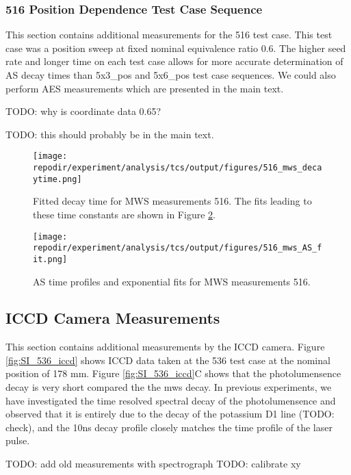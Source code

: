 \clearpage
\subsubsection{516 Position Dependence Test Case Sequence}

This section contains additional measurements for the 516 test case. This test case was a position sweep at fixed nominal equivalence ratio 0.6. The higher seed rate and longer time on each test case allows for more accurate determination of AS decay times than 5x3\_pos and 5x6\_pos test case sequences. We could also perform AES measurements which are presented in the main text. 



TODO: why is coordinate data 0.65? 

TODO: this should probably be in the main text.

\begin{figure}[]
\centering
\texttt{[image: \\repodir/experiment/analysis/tcs/output/figures/516\_mws\_decaytime.png]}
\caption{Fitted decay time for MWS measurements 516. The fits leading to these time constants are shown in Figure \ref{fig:516_mws_AS_fit}.}
\label{fig:SI_516_mws_decaytime}
\end{figure}

\begin{figure}[]
\centering
\texttt{[image: \\repodir/experiment/analysis/tcs/output/figures/516\_mws\_AS\_fit.png]}
\caption{AS time profiles and exponential fits for MWS measurements 516.}
\label{fig:516_mws_AS_fit}
\end{figure}


\clearpage
\subsection{ICCD Camera Measurements}

This section contains additional measurements by the ICCD camera. Figure \ref{fig:SI_536_iccd} shows ICCD data taken at the 536 test case at the nominal position of 178 mm. Figure \ref{fig:SI_536_iccd}C shows that the photolumensence decay is very short compared the the mws decay. In previous experiments, we have investigated the time resolved spectral decay of the photolumensence and observed that it is entirely due to the decay of the potassium D1 line (TODO: check), and the 10ns decay profile closely matches the time profile of the laser pulse. 

TODO: add old measurements with spectrograph
TODO: calibrate xy

